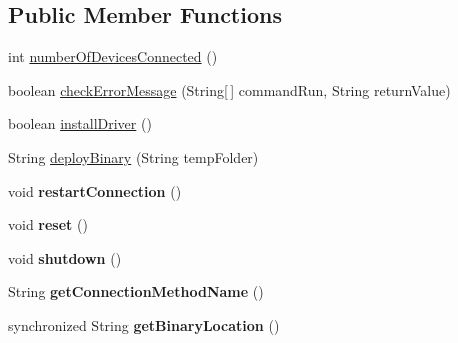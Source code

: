 \subsection*{Public Member Functions}
\begin{DoxyCompactItemize}
\item 
int \hyperlink{class_c_a_s_u_a_l_1_1communicationstools_1_1heimdall_1_1_heimdall_tools_aaf007de111f002b85a97eca3033d4629}{number\-Of\-Devices\-Connected} ()
\item 
boolean \hyperlink{class_c_a_s_u_a_l_1_1communicationstools_1_1heimdall_1_1_heimdall_tools_af81605737d346da1165c10aa2bcd3d23}{check\-Error\-Message} (String\mbox{[}$\,$\mbox{]} command\-Run, String return\-Value)
\item 
boolean \hyperlink{class_c_a_s_u_a_l_1_1communicationstools_1_1heimdall_1_1_heimdall_tools_a68e8c264cf744c75199b210347ef0cfa}{install\-Driver} ()
\item 
String \hyperlink{class_c_a_s_u_a_l_1_1communicationstools_1_1heimdall_1_1_heimdall_tools_a5d8fb62015dbfa5e8494063de94fda03}{deploy\-Binary} (String temp\-Folder)
\item 
\hypertarget{class_c_a_s_u_a_l_1_1communicationstools_1_1heimdall_1_1_heimdall_tools_a0d32e9f8fc1c0b01f55bdcb40886275d}{void {\bfseries restart\-Connection} ()}\label{class_c_a_s_u_a_l_1_1communicationstools_1_1heimdall_1_1_heimdall_tools_a0d32e9f8fc1c0b01f55bdcb40886275d}

\item 
\hypertarget{class_c_a_s_u_a_l_1_1communicationstools_1_1heimdall_1_1_heimdall_tools_a69405b8b90d2bea5a0053e5cd720c837}{void {\bfseries reset} ()}\label{class_c_a_s_u_a_l_1_1communicationstools_1_1heimdall_1_1_heimdall_tools_a69405b8b90d2bea5a0053e5cd720c837}

\item 
\hypertarget{class_c_a_s_u_a_l_1_1communicationstools_1_1heimdall_1_1_heimdall_tools_ab0e0ed05d482b1a09e07cb7086856dc6}{void {\bfseries shutdown} ()}\label{class_c_a_s_u_a_l_1_1communicationstools_1_1heimdall_1_1_heimdall_tools_ab0e0ed05d482b1a09e07cb7086856dc6}

\item 
\hypertarget{class_c_a_s_u_a_l_1_1communicationstools_1_1heimdall_1_1_heimdall_tools_aa63d3d79b7ad3fa7627cc3f2a3c262aa}{String {\bfseries get\-Connection\-Method\-Name} ()}\label{class_c_a_s_u_a_l_1_1communicationstools_1_1heimdall_1_1_heimdall_tools_aa63d3d79b7ad3fa7627cc3f2a3c262aa}

\item 
\hypertarget{class_c_a_s_u_a_l_1_1communicationstools_1_1heimdall_1_1_heimdall_tools_a70585cf67adeda9a03c636d27f499b4b}{synchronized String {\bfseries get\-Binary\-Location} ()}\label{class_c_a_s_u_a_l_1_1communicationstools_1_1heimdall_1_1_heimdall_tools_a70585cf67adeda9a03c636d27f499b4b}


\end{DoxyCompactItemize}
